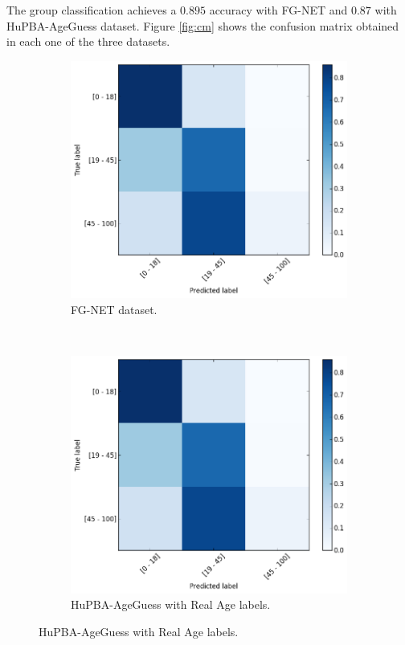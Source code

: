 The group classification achieves a $0.895$ accuracy with FG-NET and $0.87$ with HuPBA-AgeGuess dataset. Figure \ref{fig:cm} shows the confusion matrix obtained in each one of the three datasets.

\begin{figure}[!h]
	\centering
	\begin{subfigure}[b]{0.5\textwidth}
		\includegraphics[width=\textwidth]{figures/FG-NETconf_mat}
		\caption{FG-NET dataset.}
		\label{fig:cmfgnet}
	\end{subfigure}%
	~
	\begin{subfigure}[b]{0.5\textwidth}
		\includegraphics[width=\textwidth]{figures/FG-NETconf_mat}
		\captionsetup{width=1.1\textwidth}
		\caption{HuPBA-AgeGuess with Real Age labels.}
		\label{fig:cmreal}
	\end{subfigure} %
	

\end{figure}
